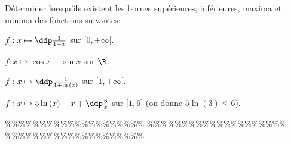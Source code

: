 



\begin{exercice}  \;
D\'eterminer lorsqu'ils existent les bornes sup\'erieures, inf\'erieures, maxima et minima des fonctions suivantes:
\begin{enumerate}
\begin{minipage}[t]{0.4\textwidth}
\item $f: x\mapsto \ddp\frac{1}{1+x}  $ sur $\lbrack 0,+\infty\lbrack$.
\item $f: x\mapsto \cos{x}+\sin{x}$ sur $\R$.
\end{minipage}
\begin{minipage}[t]{0.5\textwidth}
\item $f: x\mapsto \ddp\frac{1}{1+\ln{(x)}}$ sur $\lbrack 1,+\infty\lbrack$. 
\item $f: x\mapsto 5\ln{(x)}-x+\ddp\frac{6}{x}$ sur $\lbrack 1,6\rbrack$ (on donne $5\ln{(3)}\leq 6$).
\end{minipage}
\end{enumerate}
\end{exercice}


\%\%\%\%\%\%\%\%\%\%\%\%\%\%\%\%\%\%\%\%
\%\%\%\%\%\%\%\%\%\%\%\%\%\%\%\%\%\%\%\%
\%\%\%\%\%\%\%\%\%\%\%\%\%\%\%\%\%\%\%\%



